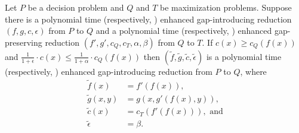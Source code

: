 \documentclass[]{article}
\begin{document}
\begin{lemma}\label{lem:compose}
  Let $P$ be a decision problem and $Q$ and $T$ be maximization problems.
  Suppose there is a polynomial time (respectively, \NC) enhanced gap-introducing reduction $(f, g, c, \epsilon)$ from $P$ to $Q$ and a polynomial time (respectively, \NC) enhanced gap-preserving reduction $(f', g', c_Q, c_T, \alpha, \beta)$ from $Q$ to $T$.
  If $c(x) \geq c_Q(f(x))$ and $\frac{1}{1 + \epsilon} \cdot c(x) \leq \frac{1}{1 + \alpha} \cdot c_Q(f(x))$ then $(\tilde{f}, \tilde{g}, \tilde{c}, \tilde{\epsilon})$ is a polynomial time (respectively, \NC) enhanced gap-introducing reduction from $P$ to $Q$, where
  \begin{align*}
    \tilde{f}(x) & = f'(f(x)), \\
    \tilde{g}(x, y) & = g(x, g'(f(x), y)), \\
    \tilde{c}(x) & = c_T(f'(f(x))), \text{ and} \\
    \tilde{\epsilon} & = \beta.
  \end{align*}
\end{lemma}
\end{document}
